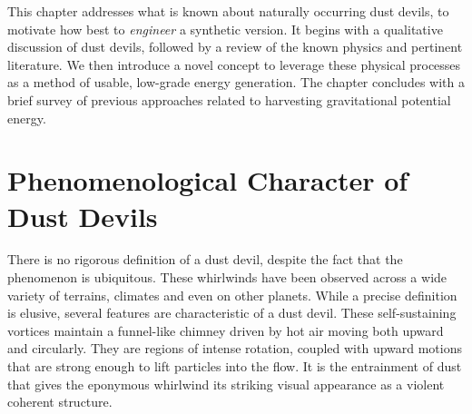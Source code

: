 \label{sec:physics}

This chapter addresses what is known about naturally occurring dust
devils, to motivate how best to \textit{engineer} a synthetic version. 
It begins with a qualitative discussion of dust devils, followed by a
review of the known physics and pertinent literature. 
We then introduce a novel concept to leverage these
physical processes as a method of usable, low-grade energy generation.  
The chapter concludes with a brief survey of previous
approaches related to harvesting gravitational potential energy.


\section{Phenomenological Character of Dust Devils}
\label{subsec:phenomena}

There is no rigorous definition of a dust devil, despite the fact that
the phenomenon is ubiquitous. These whirlwinds have been
observed across a wide variety of terrains, climates and even on
other planets\cite{Sinclair1969,Bluestein2004,JGR:JGR13978}. 
While a precise definition is elusive, several features 
are characteristic of a dust devil. These self-sustaining vortices
maintain a funnel-like chimney driven by hot air moving both upward and 
circularly. They are regions of intense rotation, coupled
with upward motions that are strong enough to lift particles into
the flow. It is the entrainment of dust that gives the eponymous
whirlwind its striking visual appearance as a violent coherent
structure.   

